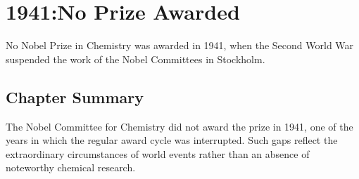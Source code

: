 \chapter{1941:No Prize Awarded}
\label{chap:chemistry1941}

No Nobel Prize in Chemistry was awarded in 1941, when the Second World War suspended the work of the Nobel Committees in Stockholm.

\section*{Chapter Summary}

The Nobel Committee for Chemistry did not award the prize in 1941, one of the years in which the regular award cycle was interrupted. Such gaps reflect the extraordinary circumstances of world events rather than an absence of noteworthy chemical research.
